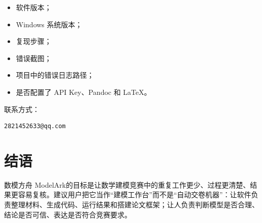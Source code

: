 \documentclass[UTF8,a4paper,12pt]{ctexart}
\newcommand{\app}{数模方舟 ModelArk}
\begin{document}
\begin{itemize}
  \item 软件版本；
  \item Windows 系统版本；
  \item 复现步骤；
  \item 错误截图；
  \item 项目中的错误日志路径；
  \item 是否配置了 API Key、Pandoc 和 LaTeX。
\end{itemize}

联系方式：

\begin{verbatim}
2821452633@qq.com
\end{verbatim}

\section*{结语}

\app 的目标是让数学建模竞赛中的重复工作更少、过程更清楚、结果更容易复核。建议用户把它当作``建模工作台''而不是``自动交卷机器''：让软件负责整理材料、生成代码、运行结果和搭建论文框架；让人负责判断模型是否合理、结论是否可信、表达是否符合竞赛要求。
\end{document}
